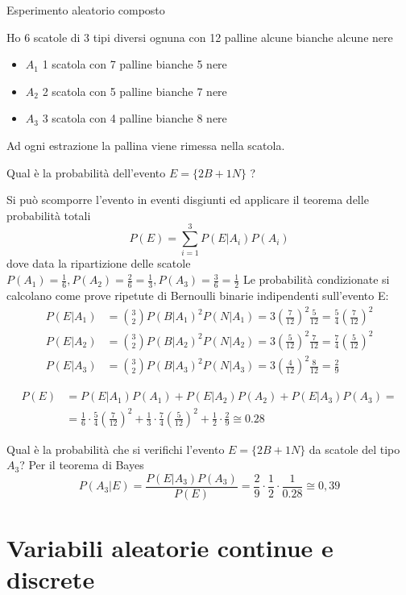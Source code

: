 \begin{esempio}
Esperimento aleatorio composto

Ho 6 scatole di 3 tipi diversi ognuna con 12 palline alcune bianche alcune nere 
\begin{itemize}
	\item $A_1$ 1 scatola con 7 palline bianche 5 nere
	\item $A_2$ 2 scatola con 5 palline bianche 7 nere
	\item $A_3$ 3 scatola con 4 palline bianche 8 nere
\end{itemize}
Ad ogni estrazione la pallina viene rimessa nella scatola.

Qual è la probabilità dell'evento $E=\lbrace 2B+1N \rbrace$ ?

Si può scomporre l'evento in eventi disgiunti ed applicare il teorema delle probabilità totali
\[P(E)=\sum_{i=1}^{3}P(E|A_i)P(A_i)\]
dove data la ripartizione delle scatole $P(A_1)=\frac{1}{6}, P(A_2)=\frac{2}{6}=\frac{1}{3}, P(A_3)=\frac{3}{6}=\frac{1}{2}$  
Le probabilità condizionate si calcolano come prove ripetute di Bernoulli binarie indipendenti sull'evento E:
\[\begin{split}
P(E|A_1)&=\binom{3}{2}P(B|A_1)^2 P(N|A_1)=3\left(\frac{7}{12}\right)^2\frac{5}{12}=\frac{5}{4}\left(\frac{7}{12}\right)^2\\
P(E|A_2)&=\binom{3}{2}P(B|A_2)^2 P(N|A_2)=3\left(\frac{5}{12}\right)^2\frac{7}{12}=\frac{7}{4}\left(\frac{5}{12}\right)^2\\
P(E|A_3)&=\binom{3}{2}P(B|A_3)^2 P(N|A_3)=3\left(\frac{4}{12}\right)^2\frac{8}{12}=\frac{2}{9}
\end{split}\]

\[\begin{split}P(E)&=P(E|A_1)P(A_1)+P(E|A_2)P(A_2)+P(E|A_3)P(A_3)=\\
&=\frac{1}{6}\cdot\frac{5}{4}\left(\frac{7}{12}\right)^2+\frac{1}{3}\cdot\frac{7}{4}\left(\frac{5}{12}\right)^2+\frac{1}{2}\cdot\frac{2}{9}\cong 0.28\end{split}\]

Qual è la probabilità che si verifichi l'evento $E=\lbrace 2B+1N\rbrace$ da scatole del tipo $A_3$?
Per il teorema di Bayes
\[P(A_3|E)=\frac{P(E|A_3)P(A_3)}{P(E)}=\frac{2}{9}\cdot\frac{1}{2}\cdot\frac{1}{0.28}\cong 0,39\]
\end{esempio}

\chapter{Variabili aleatorie continue e discrete}
